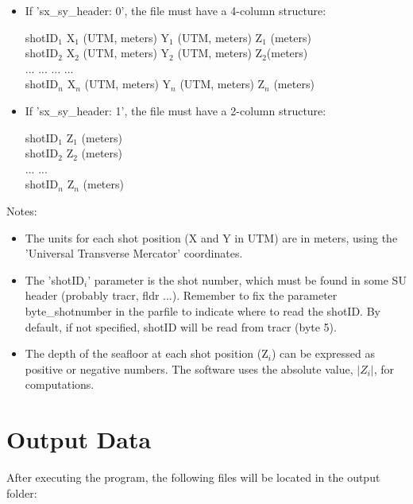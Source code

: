 \documentclass[11pt, oneside]{article}   	%
\begin{document}
\begin{itemize}
  \item If 'sx\_sy\_header: 0', the file must have a 4-column structure:

  shotID$_1$   X$_1$ (UTM, meters)   Y$_1$ (UTM, meters)   Z$_1$ (meters) \\
  shotID$_2$   X$_2$ (UTM, meters)   Y$_2$ (UTM, meters)   Z$_2$(meters) \\ 
  ...        ...                 ...                 ... \\
  shotID$_n$  X$_n$ (UTM, meters)   Y$_n$ (UTM, meters)   Z$_n$ (meters) 

\item If 'sx\_sy\_header: 1', the file must have a 2-column structure:

  shotID$_1$   Z$_1$ (meters) \\
  shotID$_2$  Z$_2$ (meters) \\
  ...        ... \\
  shotID$_n$   Z$_n$ (meters) 

\end{itemize}

Notes:
\begin{itemize}
  \item The units for each shot position (X and Y in UTM) are in meters, using the 'Universal Transverse Mercator' coordinates.
  \item The 'shotID$_i$' parameter is the shot number, which must be found in some SU header (probably tracr, fldr ...). Remember to fix the parameter byte\_shotnumber in the parfile to indicate where to read the shotID. By default, if not specified, shotID will be read from tracr (byte 5).
  \item The depth of the seafloor at each shot position (Z$_i$) can be expressed as positive or negative numbers. The software uses the absolute value, $|Z_i|$, for computations.
\end{itemize}


\section{Output Data}\label{sec5}

After executing the program, the following files will be located in the output folder:
\end{document}
